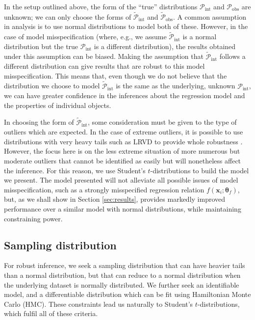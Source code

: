 \documentclass[fleqn,usenatbib]{rasti}
\begin{document}
In the setup outlined above, the form of the ``true'' distributions
$\mathcal{P}_{\text{int}}$ and $\mathcal{P}_{\text{obs}}$ are unknown; we can
only choose the forms of $\tilde{\mathcal{P}}_{\text{int}}$ and
$\tilde{\mathcal{P}}_{\text{obs}}$. A common assumption in analysis is to use
normal distributions to model both of these.  However, in the case of model
misspecification (where, e.g., we assume $\tilde{\mathcal{P}}_{\text{int}}$ is a
normal distribution but the true $\mathcal{P}_{\text{int}}$ is a different
distribution), the results obtained under this assumption can be biased. Making
the assumption that $\tilde{\mathcal{P}}_{\text{int}}$ follows a different
distribution can give results that are robust to this model misspecification.
This means that, even though we do not believe that the distribution we choose
to model $\tilde{\mathcal{P}}_{\text{int}}$ is the same as the underlying,
unknown $\mathcal{P}_{\text{int}}$, we can have greater confidence in the
inferences about the regression model and the properties of individual objects.

In choosing the form of $\tilde{\mathcal{P}}_{\text{int}}$, some consideration
must be given to the type of outliers which are expected. In the case of extreme
outliers, it is possible to use distributions with very heavy tails such as LRVD
to provide whole robustness \citep{Gagnon:2020, Hamura:2022}. However, the focus
here is on the less extreme situation of more numerous but moderate outliers
that cannot be identified as easily but will nonetheless affect the inference.
For this reason, we use Student's $t$-distributions to build the model we
present. The model presented will not alleviate all possible issues of model
misspecification, such as a strongly misspecified regression relation
$f(\mathbf{x}_i; \mathbf{\theta}_f)$, but, as we shall show in Section
\ref{sec:results}, provides markedly improved performance over a similar model
with normal distributions, while maintaining constraining power.

\subsection{Sampling distribution}
\label{sec:formalism.sampling}

For robust inference, we seek a sampling distribution that can have heavier
tails than a normal distribution, but that can reduce to a normal distribution
when the underlying dataset is normally distributed. We further seek an
identifiable model, and a differentiable distribution which can be fit using
Hamiltonian Monte Carlo (HMC). These constraints lead us naturally to Student's
$t$-distributions, which fulfil all of these criteria.
\end{document}
